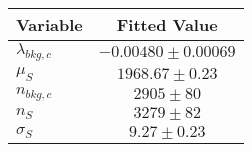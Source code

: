 \begin{tabular}[t]{lc}
\hline
Variable &Fitted Value\\
\hline\hline
$\lambda_{bkg,c}$&$-0.00480\pm0.00069$\\
\hline
$\mu_{S}$&$1968.67\pm0.23$\\
\hline
$n_{bkg,c}$&$2905\pm80$\\
\hline
$n_{S}$&$3279\pm82$\\
\hline
$\sigma_{S}$&$9.27\pm0.23$\\
\hline
\end{tabular}